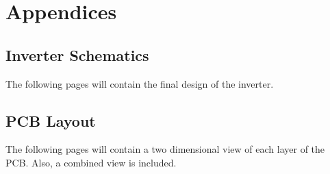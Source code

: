 \documentclass[11pt,titlepage]{report}
\begin{document}
\chapter{Appendices}
\section{Inverter Schematics}
\label{app:schematics}
The following pages will contain the final design of the inverter.


\section{PCB Layout}
\label{app:pcb_layout}
The following pages will contain a two dimensional view of each layer of the PCB. Also, a combined view is included.

\end{document}
